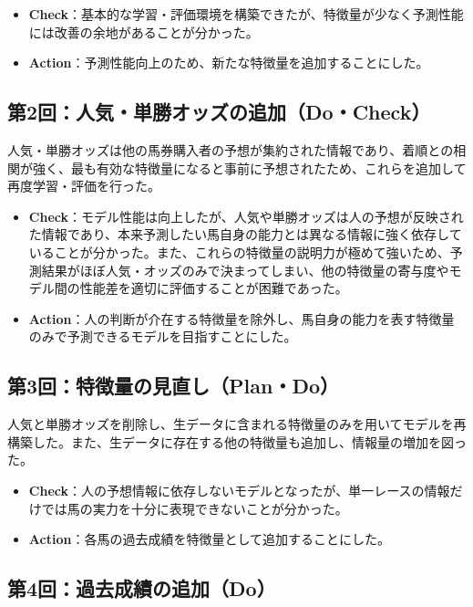 \documentclass[dvipdfmx, a4paper, 11pt, titlepage]{jsarticle}
\begin{document}
\begin{itemize}
    \item \textbf{Check}：基本的な学習・評価環境を構築できたが、特徴量が少なく予測性能には改善の余地があることが分かった。
    \item \textbf{Action}：予測性能向上のため、新たな特徴量を追加することにした。
\end{itemize}

\subsection{第2回：人気・単勝オッズの追加（Do・Check）}
人気・単勝オッズは他の馬券購入者の予想が集約された情報であり、着順との相関が強く、最も有効な特徴量になると事前に予想されたため、これらを追加して再度学習・評価を行った。
\begin{itemize}
    \item \textbf{Check}：モデル性能は向上したが、人気や単勝オッズは人の予想が反映された情報であり、本来予測したい馬自身の能力とは異なる情報に強く依存していることが分かった。また、これらの特徴量の説明力が極めて強いため、予測結果がほぼ人気・オッズのみで決まってしまい、他の特徴量の寄与度やモデル間の性能差を適切に評価することが困難であった。
    \item \textbf{Action}：人の判断が介在する特徴量を除外し、馬自身の能力を表す特徴量のみで予測できるモデルを目指すことにした。
\end{itemize}

\subsection{第3回：特徴量の見直し（Plan・Do）}

人気と単勝オッズを削除し、生データに含まれる特徴量のみを用いてモデルを再構築した。また、生データに存在する他の特徴量も追加し、情報量の増加を図った。

\begin{itemize}
    \item \textbf{Check}：人の予想情報に依存しないモデルとなったが、単一レースの情報だけでは馬の実力を十分に表現できないことが分かった。
    \item \textbf{Action}：各馬の過去成績を特徴量として追加することにした。
\end{itemize}

\subsection{第4回：過去成績の追加（Do）}
\end{document}
